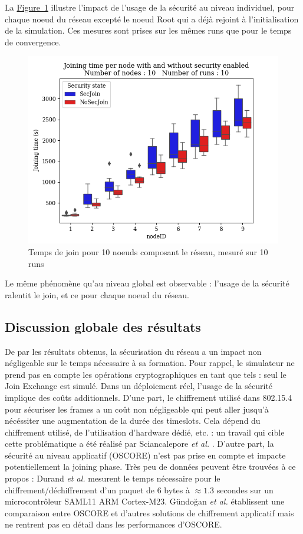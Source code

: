\documentclass[]{report}
\newcommand{\wordlink}[2]{\hyperref[#2]{#1~\ref{#2}}}
\begin{document}
La \wordlink{Figure}{fig:join_times} illustre l'impact de l'usage de la sécurité au niveau individuel, pour chaque noeud du réseau excepté le noeud Root qui a déjà rejoint à l'initialisation de la simulation. Ces mesures sont prises sur les mêmes runs que pour le temps de convergence. 

 \vspace{0.2cm}
	\begin{figure}[!h]
	\centering
	\includegraphics[width=0.7\linewidth]{results/secjoin/boxesJoiningTimePerNode10.png}
	\caption{Temps de join pour 10 noeuds composant le réseau, mesuré sur 10 runs}
	\label{fig:join_times}
	\end{figure}

Le même phénomène qu'au niveau global est observable : l'usage de la sécurité ralentit le join, et ce pour chaque noeud du réseau.

\subsection{Discussion globale des résultats} 

De par les résultats obtenus, la sécurisation du réseau a un impact non négligeable sur le temps nécessaire à sa formation. Pour rappel, le simulateur ne prend pas en compte les opérations cryptographiques en tant que tels : seul le Join Exchange est simulé. Dans un déploiement réel, l'usage de la sécurité implique des coûts additionnels. D'une part, le chiffrement utilisé dans 802.15.4 pour sécuriser les frames a un coût non négligeable qui peut aller jusqu'à nécéssiter une augmentation de la durée des timeslots. Cela dépend du chiffrement utilisé, de l'utilisation d'hardware dédié, etc. : un travail qui cible cette problématique a été réalisé par Sciancalepore \textit{et al.} \cite{link-layer-sec-impact}. D'autre part, la sécurité au niveau applicatif (OSCORE) n'est pas prise en compte et impacte potentiellement la joining phase. Très peu de données peuvent être trouvées à ce propos : Durand \textit{et al.} \cite{OSCOREtimes} mesurent le temps nécessaire pour le chiffrement/déchiffrement d'un paquet de 6 bytes à $\approx 1.3$ secondes sur un microcontrôleur SAML11 ARM Cortex-M23. Gündoğan \textit{et al.} \cite{OSCOREvsNDN} établissent une comparaison entre OSCORE et d'autres solutions de chiffrement applicatif mais ne rentrent pas en détail dans les performances d'OSCORE.
\end{document}
